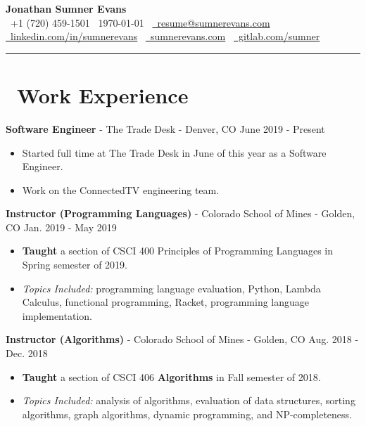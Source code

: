 \documentclass[10pt,letterpaper]{article}
\begin{document}
\begin{center}
    {\huge\textbf{Jonathan Sumner Evans}} \\
    \vspace{3pt}
    \faPhone\ +1 (720) 459-1501
    \textbar\ \today
    \textbar\ \href{mailto:resume@sumnerevans.com}{\faEnvelope\ resume@sumnerevans.com} \\
    \href{https://www.linkedin.com/in/sumnerevans}{\faLinkedin\ linkedin.com/in/sumnerevans}
    \textbar\ \href{https://sumnerevans.com}{\faGlobe\ sumnerevans.com}
    \textbar\ \href{https://gitlab.com/sumner}{\faGitlab\ gitlab.com/sumner}
    \rule{\textwidth}{0.5pt}
\end{center}

\section*{\faBriefcase\ Work Experience}
\textbf{Software Engineer} - The Trade Desk - Denver, CO
\hfill June 2019 - Present
\begin{itemize}
    \item Started full time at The Trade Desk in June of this year as a Software
        Engineer.
    \item Work on the ConnectedTV engineering team.
\end{itemize}

\textbf{Instructor (Programming Languages)} - Colorado School of Mines - Golden, CO
\hfill Jan. 2019 - May 2019
\begin{itemize}
    \item \textbf{Taught} a section of CSCI 400 Principles of Programming
        Languages in Spring semester of 2019.
    \item \textit{Topics Included:} programming language evaluation, Python,
        Lambda Calculus, functional programming, Racket, programming language
        implementation.
\end{itemize}

\textbf{Instructor (Algorithms)} - Colorado School of Mines - Golden, CO
\hfill Aug. 2018 - Dec. 2018
\begin{itemize}
    \item \textbf{Taught} a section of CSCI 406 \textbf{Algorithms} in Fall
        semester of 2018.
    \item \textit{Topics Included:} analysis of algorithms, evaluation of data
        structures, sorting algorithms, graph algorithms, dynamic programming,
        and NP-completeness.
\end{itemize}
\end{document}
